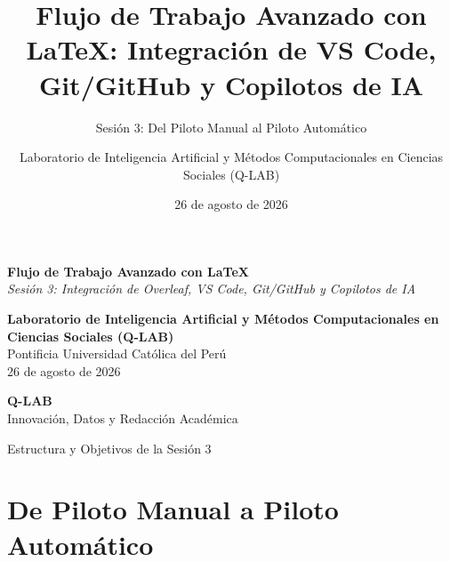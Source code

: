 \documentclass[aspectratio=169, 10pt]{beamer}
\title[\LaTeX\ en VS Code, Git \& IA]{Flujo de Trabajo Avanzado con \LaTeX: Integración de VS Code, Git/GitHub y Copilotos de IA}
\subtitle{Sesión 3: Del Piloto Manual al Piloto Automático}
\author[Q-LAB - PUCP]{Laboratorio de Inteligencia Artificial y Métodos Computacionales en Ciencias Sociales (Q-LAB)}
\institute[PUCP]{Pontificia Universidad Católica del Perú}
\date{26 de agosto de 2026}
\begin{document}
\begin{frame}[plain]
  \vfill
  \centering
  \begin{tcolorbox}[colback=pucpRed,colframe=pucpRed,coltext=white,boxrule=0pt,arc=2.5mm,width=0.95\textwidth,halign=center,top=2.8mm,bottom=2.8mm]
    {\Large\textbf{Flujo de Trabajo Avanzado con \LaTeX}}\\[0.5ex]
    {\small\textit{Sesión 3: Integración de Overleaf, VS Code, Git/GitHub y Copilotos de IA}}
  \end{tcolorbox}
  
  \vspace{0.35cm}
  {\small\textbf{Laboratorio de Inteligencia Artificial y Métodos Computacionales en Ciencias Sociales (Q-LAB)}}\\[0.3ex]
  {\footnotesize Pontificia Universidad Católica del Perú}\\[0.5ex]
  {\scriptsize 26 de agosto de 2026}
  
  \vspace{0.35cm}
  \begin{tcolorbox}[colback=pucpBlue,colframe=pucpBlue,coltext=white,boxrule=0pt,arc=2.5mm,width=0.42\textwidth,halign=center,top=1.8mm,bottom=1.8mm]
    \textbf{\normalsize Q-LAB}\\[0.1ex]
    \tiny Innovación, Datos y Redacción Académica
  \end{tcolorbox}
  \vfill
\end{frame}

\begin{frame}{Estructura y Objetivos de la Sesión 3}
  \tableofcontents
\end{frame}

\section[Piloto Automático]{De Piloto Manual a Piloto Automático}
\end{document}
